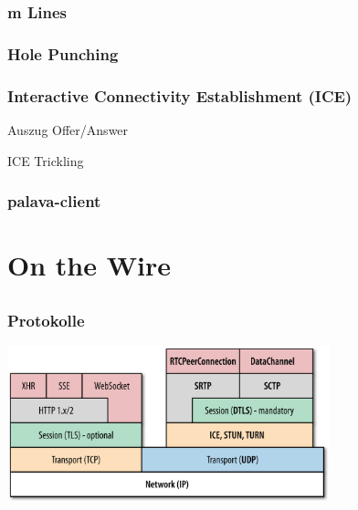 \documentclass[12pt]{beamer}
\begin{document}
\begin{frame}
  \frametitle{m Lines}



\end{frame}

\begin{frame}
  \frametitle{Hole Punching}
  \centerline{}
\end{frame}

\begin{frame}
  \frametitle{Interactive Connectivity Establishment (ICE)}
  \pause
  
  \hfill \tiny Auszug Offer/Answer
  \vspace{15pt}
  \pause
  
  
  \hfill \tiny ICE Trickling
\end{frame}

\begin{frame}
  \frametitle{palava-client}
  \pause
  
\end{frame}


\section{On the Wire}
\subsection{} 

\begin{frame}
  \frametitle{Protokolle}
  \centerline{\includegraphics[width=0.7\textwidth]{img/stack_oreilly.png}}
\end{frame}
\end{document}
